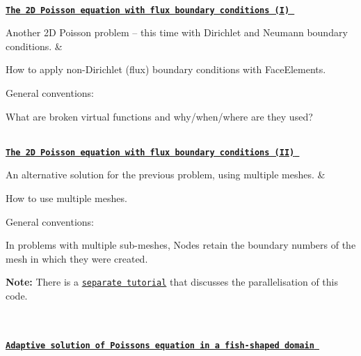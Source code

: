 \begin{longtabu}
\\
\href{../../poisson/two_d_poisson_flux_bc/html/index.html}{\tt {\bfseries  The 2D Poisson equation with flux boundary conditions (I) }}

Another 2D Poisson problem -- this time with Dirichlet and Neumann boundary conditions.  &
\begin{DoxyItemize}
\item How to apply non-\/\+Dirichlet (flux) boundary conditions with {\ttfamily Face\+Elements}.
\item General conventions\+:
\begin{DoxyItemize}
\item What are broken virtual functions and why/when/where are they used? 
\end{DoxyItemize}
\end{DoxyItemize}

\\
\href{../../poisson/two_d_poisson_flux_bc2/html/index.html}{\tt {\bfseries  The 2D Poisson equation with flux boundary conditions (II) }}

An alternative solution for the previous problem, using multiple meshes.  &
\begin{DoxyItemize}
\item How to use multiple meshes.
\item General conventions\+:
\begin{DoxyItemize}
\item In problems with multiple sub-\/meshes, {\ttfamily Nodes} retain the boundary numbers of the mesh in which they were created.
\end{DoxyItemize}
\item {\bfseries Note\+:} There is a \href{../../mpi/two_d_poisson_flux_bc_adapt/html/index.html}{\tt separate tutorial} that discusses the parallelisation of this code. 
\end{DoxyItemize}

\\
\\
\href{../../poisson/fish_poisson/html/index.html}{\tt {\bfseries  Adaptive solution of Poisson\textquotesingle{}s equation in a fish-\/shaped domain }}


\end{longtabu}
